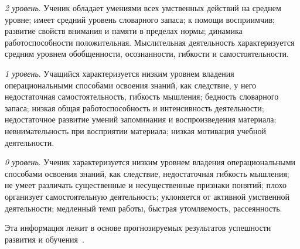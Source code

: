 \textit{2 уровень}. Ученик обладает умениями всех умственных действий на среднем уровне;
имеет средний уровень словарного запаса; к помощи восприимчив;
развитие свойств внимания и памяти в пределах нормы; динамика работоспособности положительная.
Мыслительная деятельность характеризуется средним уровнем обобщенности, осознанности,
гибкости и самостоятельности.

\textit{1 уровень}. Учащийся характеризуется низким уровнем владения операциональными способами
освоения знаний, как следствие, у него недостаточная самостоятельность, гибкость мышления;
бедность словарного запаса; низкая общая работоспособность и интенсивность деятельности;
недостаточное развитие умений запоминания и воспроизведения материала;
невнимательность при восприятии материала; низкая мотивация учебной деятельности.

\textit{0 уровень}. Ученик характеризуется низким уровнем владения операциональными способами
освоения знаний, как следствие, недостаточная гибкость мышления;
не умеет различать существенные и несущественные признаки понятий;
плохо организует самостоятельную деятельность;
уклоняется от активной умственной деятельности;
медленный темп работы, быстрая утомляемость, рассеянность.

Эта информация лежит в основе прогнозируемых результатов
успешности развития и обучения~\cite{zimnyaya1997}.